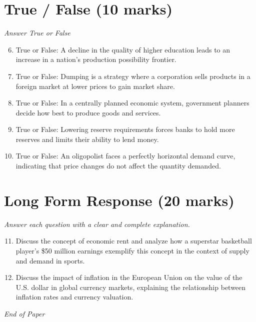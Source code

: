\documentclass[12pt]{article}
\begin{document}
\section*{True / False (10 marks)}
\textit{Answer True or False}
\begin{enumerate}[label=\arabic*.]
\setcounter{enumi}{5}
\item True or False: A decline in the quality of higher education leads to an increase in a nation's production possibility frontier.
\item True or False: Dumping is a strategy where a corporation sells products in a foreign market at lower prices to gain market share.
\item True or False: In a centrally planned economic system, government planners decide how best to produce goods and services.
\item True or False: Lowering reserve requirements forces banks to hold more reserves and limits their ability to lend money.
\item True or False: An oligopolist faces a perfectly horizontal demand curve, indicating that price changes do not affect the quantity demanded.
\end{enumerate}

\section*{Long Form Response (20 marks)}
\textit{Answer each question with a clear and complete explanation.}
\begin{enumerate}[label=\arabic*.]
\setcounter{enumi}{10}
\item Discuss the concept of economic rent and analyze how a superstar basketball player's \$50 million earnings exemplify this concept in the context of supply and demand in sports.
\item Discuss the impact of inflation in the European Union on the value of the U.S. dollar in global currency markets, explaining the relationship between inflation rates and currency valuation.
\end{enumerate}

\vfill
\noindent\textit{End of Paper}
\end{document}

